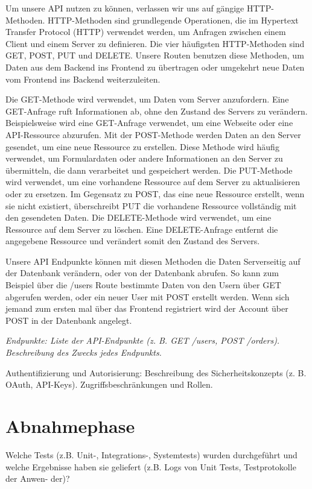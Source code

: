 \documentclass[a4paper,12pt]{article}
\begin{document}
Um unsere API nutzen zu können, verlassen wir uns auf gängige HTTP-Methoden. HTTP-Methoden sind grundlegende Operationen, die im Hypertext Transfer Protocol (HTTP) verwendet werden, um Anfragen zwischen einem Client und einem Server zu definieren. Die vier häufigsten HTTP-Methoden sind GET, POST, PUT und DELETE. Unsere Routen benutzen diese Methoden, um Daten aus dem Backend ins Frontend zu übertragen oder umgekehrt neue Daten vom Frontend ins Backend weiterzuleiten.
 
Die GET-Methode wird verwendet, um Daten vom Server anzufordern. Eine GET-Anfrage ruft Informationen ab, ohne den Zustand des Servers zu verändern. Beispielsweise wird eine GET-Anfrage verwendet, um eine Webseite oder eine API-Ressource abzurufen.
Mit der POST-Methode werden Daten an den Server gesendet, um eine neue Ressource zu erstellen. Diese Methode wird häufig verwendet, um Formulardaten oder andere Informationen an den Server zu übermitteln, die dann verarbeitet und gespeichert werden.
Die PUT-Methode wird verwendet, um eine vorhandene Ressource auf dem Server zu aktualisieren oder zu ersetzen. Im Gegensatz zu POST, das eine neue Ressource erstellt, wenn sie nicht existiert, überschreibt PUT die vorhandene Ressource vollständig mit den gesendeten Daten.
Die DELETE-Methode wird verwendet, um eine Ressource auf dem Server zu löschen. Eine DELETE-Anfrage entfernt die angegebene Ressource und verändert somit den Zustand des Servers.

Unsere API Endpunkte können mit diesen Methoden die Daten Serverseitig auf der Datenbank verändern, oder von der Datenbank abrufen. So kann zum Beispiel über die /users Route bestimmte Daten von den Usern über GET abgerufen werden, oder ein neuer User mit POST erstellt werden. Wenn sich jemand zum ersten mal über das Frontend registriert wird der Account über POST in der Datenbank angelegt. 

\textit{Endpunkte: Liste der API-Endpunkte (z. B. GET /users, POST /orders).
Beschreibung des Zwecks jedes Endpunkts.}

Authentifizierung und Autorisierung: Beschreibung des Sicherheitskonzepts (z. B.
OAuth, API-Keys).  Zugriffsbeschränkungen und Rollen.

\newpage \section{Abnahmephase}
Welche Tests (z.B. Unit-, Integrations-,
Systemtests) wurden durchgeführt und welche Ergebnisse haben sie geliefert
(z.B. Logs von Unit Tests, Testprotokolle der Anwen- der)?
\end{document}
